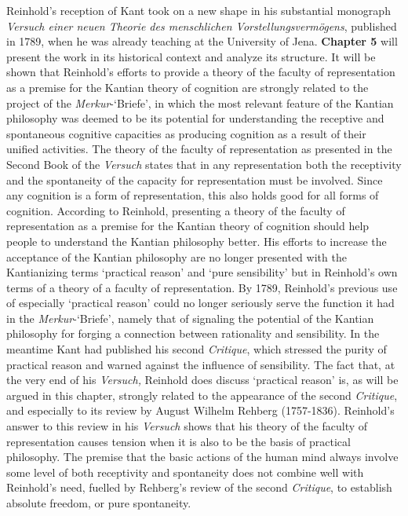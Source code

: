 Reinhold's reception of Kant took on a new shape in his substantial monograph \textit{Versuch einer neuen Theorie des menschlichen Vorstellungsverm\"{o}gens}, published in 1789, when he was already teaching at the University of Jena. \textbf{Chapter 5} will present the work in its historical context and analyze its structure. It will be shown that Reinhold's efforts to provide a theory of the faculty of representation as a premise for the Kantian theory of cognition are strongly related to the project of the \textit{Merkur}{-}`Briefe', in which the most relevant feature of the Kantian philosophy was deemed to be its potential for understanding the receptive and spontaneous cognitive capacities as producing cognition as a result of their unified activities. The theory of the faculty of representation as presented in the Second Book of the \textit{Versuch} states that in any representation both the receptivity and the spontaneity of the capacity for representation must be involved. Since any cognition is a form of representation, this also holds good for all forms of cognition. According to Reinhold, presenting a theory of the faculty of representation as a premise for the Kantian theory of cognition should help people to understand the Kantian philosophy better. His efforts to increase the acceptance of the Kantian philosophy are no longer presented with the Kantianizing terms `practical reason' and `pure sensibility' but in Reinhold's own terms of a theory of a faculty of representation. By 1789, Reinhold's previous use of especially `practical reason' could no longer seriously serve the function it had in the \textit{Merkur}{-}`Briefe', namely that of signaling the potential of the Kantian philosophy for forging a connection between rationality and sensibility. In the meantime Kant had published his second \textit{Critique}, which stressed the purity of practical reason and warned against the influence of sensibility. The fact that, at the very end of his \textit{Versuch,} Reinhold does discuss `practical reason' is, as will be argued in this chapter, strongly related to the appearance of the second \textit{Critique}, and especially to its review by August Wilhelm Rehberg (1757{-}1836). Reinhold's answer to this review in his \textit{Versuch} shows that his theory of the faculty of representation causes tension when it is also to be the basis of practical philosophy. The premise that the basic actions of the human mind always involve some level of both receptivity and spontaneity does not combine well with Reinhold's need, fuelled by Rehberg's review of the second \textit{Critique}, to establish absolute freedom, or pure spontaneity. 


